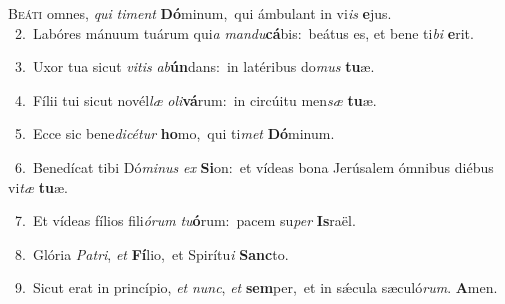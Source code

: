\lettrine{\initial\textcolor{\initialcolor}{B}}{eáti} omnes, \textit{qui} \textit{ti}\-\textit{ment} \textbf{Dó}\-minum,~\star qui ámbulant in vi\textit{is} \textbf{e}\-jus.\\
{\numbfont\textcolor{\numbcolor}{~2.}}~Labóres mánuum tuárum qui\textit{a} \textit{man}\-\textit{du}\textbf{cá}bis:~\star beátus es, et bene ti\textit{bi} \textbf{e}\-rit.\par
{\numbfont\textcolor{\numbcolor}{~3.}}~Uxor tua sicut \textit{vi}\-\textit{tis} \textit{ab}\-\textbf{ún}dans:~\star in latéribus do\textit{mus} \textbf{tu}\-æ.\par
{\numbfont\textcolor{\numbcolor}{~4.}}~Fílii tui sicut novél\textit{læ} \textit{o}\-\textit{li}\textbf{vá}rum:~\star in circúitu men\textit{sæ} \textbf{tu}\-æ.\par
{\numbfont\textcolor{\numbcolor}{~5.}}~Ecce sic bene\-\textit{di}\-\textit{cé}\textit{tur} \textbf{ho}\-mo,~\star qui ti\textit{met} \textbf{Dó}\-minum.\par
{\numbfont\textcolor{\numbcolor}{~6.}}~Benedícat tibi Dó\-\textit{mi}\-\textit{nus} \textit{ex} \textbf{Si}\-on:~\star et vídeas bona Jerúsalem ómnibus diébus vi\textit{tæ} \textbf{tu}\-æ.\par
{\numbfont\textcolor{\numbcolor}{~7.}}~Et vídeas fílios fili\-\textit{ó}\-\textit{rum} \textit{tu}\-\textbf{ó}rum:~\star pacem su\textit{per} \textbf{Is}\-raël.\par
{\numbfont\textcolor{\numbcolor}{~8.}}~Glória \textit{Pa}\-\textit{tri}, \textit{et} \textbf{Fí}\-lio,~\star et Spirítu\textit{i} \textbf{Sanc}\-to.\par
{\numbfont\textcolor{\numbcolor}{~9.}}~Sicut erat in princípio, \textit{et} \textit{nunc}\-, \textit{et} \textbf{sem}\-per,~\star et in sǽcula sæculó\-\textit{rum}\-. \textbf{A}\-men.\par

